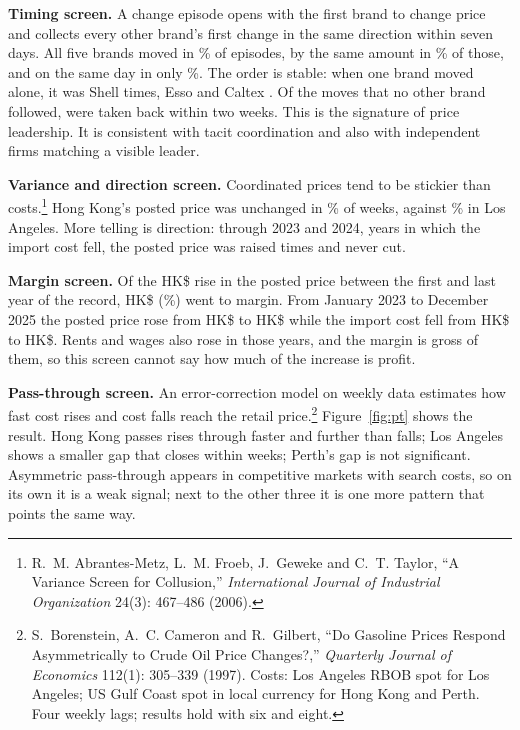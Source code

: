 \documentclass[11pt]{article}
\newcommand{\hk}{HK\$}
\begin{document}
\textbf{Timing screen.} A change episode opens with the first brand to change price and collects every other brand's first change in the same direction within seven days. All five brands moved in \hkShareFullWeek\% of episodes, by the same amount in \hkShareSameSize\% of those, and on the same day in only \hkShareSameDay\%. The order is stable: when one brand moved alone, it was Shell \hkLeadShell{} times, Esso \hkLeadEsso{} and Caltex \hkLeadCaltex. Of the \hkLone{} moves that no other brand followed, \hkLoneReversed{} were taken back within two weeks. This is the signature of price leadership. It is consistent with tacit coordination and also with independent firms matching a visible leader.

\textbf{Variance and direction screen.} Coordinated prices tend to be stickier than costs.\footnote{R.~M. Abrantes-Metz, L.~M. Froeb, J.~Geweke and C.~T. Taylor, ``A Variance Screen for Collusion,'' \emph{International Journal of Industrial Organization} 24(3): 467--486 (2006).} Hong Kong's posted price was unchanged in \hkUnchangedWeeks\% of weeks, against \laUnchangedWeeks\% in Los Angeles. More telling is direction: through 2023 and 2024, years in which the import cost fell, the posted price was raised \hkUpTwentyThreeFour{} times and never cut.

\textbf{Margin screen.} Of the \hk\postedRise{} rise in the posted price between the first and last year of the record, \hk\marginRise{} (\marginShareOfRise\%) went to margin. From January 2023 to December 2025 the posted price rose from \hk\spanPostedFrom{} to \hk\spanPostedTo{} while the import cost fell from \hk\spanImportFrom{} to \hk\spanImportTo. Rents and wages also rose in those years, and the margin is gross of them, so this screen cannot say how much of the increase is profit.

\textbf{Pass-through screen.} An error-correction model on weekly data estimates how fast cost rises and cost falls reach the retail price.\footnote{S.~Borenstein, A.~C. Cameron and R.~Gilbert, ``Do Gasoline Prices Respond Asymmetrically to Crude Oil Price Changes?,'' \emph{Quarterly Journal of Economics} 112(1): 305--339 (1997). Costs: Los Angeles RBOB spot for Los Angeles; US Gulf Coast spot in local currency for Hong Kong and Perth. Four weekly lags; results hold with six and eight.} Figure~\ref{fig:pt} shows the result. Hong Kong passes rises through faster and further than falls; Los Angeles shows a smaller gap that closes within weeks; Perth's gap is not significant. Asymmetric pass-through appears in competitive markets with search costs, so on its own it is a weak signal; next to the other three it is one more pattern that points the same way.
\end{document}
